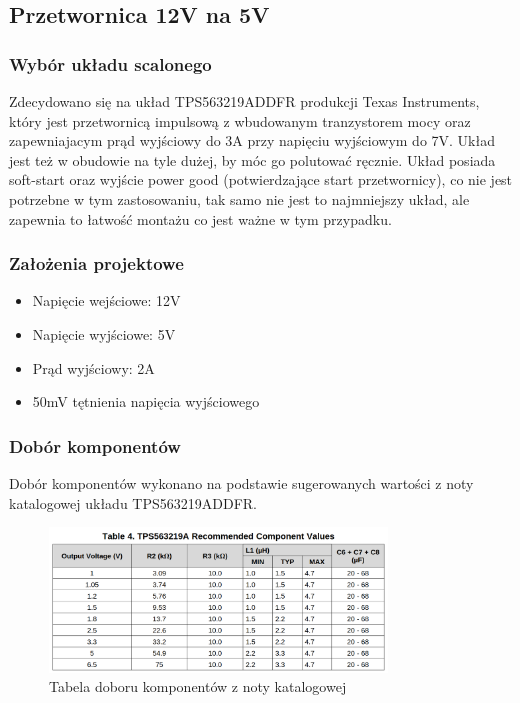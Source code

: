 \documentclass{article}
\begin{document}
\subsection{Przetwornica 12V na 5V}
\subsubsection{Wybór układu scalonego}

Zdecydowano się na układ TPS563219ADDFR produkcji Texas Instruments, który jest przetwornicą impulsową z wbudowanym tranzystorem mocy oraz zapewniajacym prąd wyjściowy do 3A przy 
napięciu wyjściowym do 7V. Układ jest też w obudowie na tyle dużej, by móc go polutować ręcznie. Układ posiada soft-start oraz wyjście power good (potwierdzające start przetwornicy), co nie jest potrzebne w tym zastosowaniu, tak samo 
nie jest to najmniejszy układ, ale zapewnia to łatwość montażu co jest ważne w tym przypadku.

\subsubsection{Założenia projektowe}
\begin{itemize}
    \item Napięcie wejściowe: 12V
    \item Napięcie wyjściowe: 5V
    \item Prąd wyjściowy: 2A
    \item 50mV tętnienia napięcia wyjściowego
\end{itemize}

\subsubsection{Dobór komponentów}
Dobór komponentów wykonano na podstawie sugerowanych wartości z noty katalogowej układu TPS563219ADDFR.

\begin{figure}[H]
    \centering
    \includegraphics[width=0.8\textwidth]{conv-table.png}
    \caption{Tabela doboru komponentów z noty katalogowej}
\end{figure}
\end{document}
